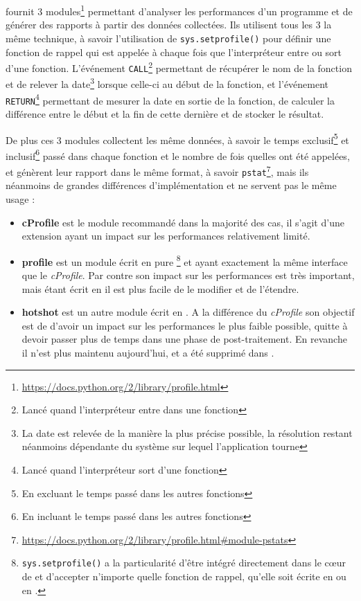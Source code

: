 \Python fournit 3 modules\footnote{\url{https://docs.python.org/2/library/profile.html}} permettant d'analyser les performances d'un programme et de générer des rapports à partir des données collectées. Ils utilisent tous les 3 la même technique, à savoir l'utilisation de \verb|sys.setprofile()| pour définir une fonction de rappel qui est appelée à chaque fois que l'interpréteur entre ou sort d'une fonction. L'événement \verb|CALL|\footnote{Lancé quand l'interpréteur entre dans une fonction} permettant de récupérer le nom de la fonction et de relever la date\footnote{La date est relevée de la manière la plus précise possible, la résolution restant néanmoins dépendante du système sur lequel l'application tourne} lorsque celle-ci au début de la fonction, et l'événement \verb|RETURN|\footnote{Lancé quand l'interpréteur sort d'une fonction} permettant de mesurer la date en sortie de la fonction, de calculer la différence entre le début et la fin de cette dernière et de stocker le résultat.

De plus ces 3 modules collectent les même données, à savoir le temps exclusif\footnote{En excluant le temps passé dans les autres fonctions} et inclusif\footnote{En incluant le temps passé dans les autres fonctions} passé dans chaque fonction et le nombre de fois quelles ont été appelées, et génèrent leur rapport dans le même format, à savoir \verb|pstat|\footnote{\url{https://docs.python.org/2/library/profile.html#module-pstats}}, mais ils néanmoins de grandes différences d'implémentation et ne servent pas le même usage : 
\begin{itemize}
\item \textbf{cProfile} est le module recommandé dans la majorité des cas, il s'agit d'une extension \C ayant un impact sur les performances relativement limité.
\item \textbf{profile} est un module écrit en pure \Python\footnote{\verb?sys.setprofile()? a la particularité d'être intégré directement dans le cœur de \Python et d'accepter n'importe quelle fonction de rappel, qu'elle soit écrite en \C ou en \Python.} et ayant exactement la même interface que le \emph{cProfile}. Par contre son impact sur les performances est très important, mais étant écrit en \Python il est plus facile de le modifier et de l'étendre.
\item \textbf{hotshot} est un autre module écrit en \C. A la différence du \emph{cProfile} son objectif est de d'avoir un impact sur les performances le plus faible possible, quitte à devoir passer plus de temps dans une phase de post-traitement. En revanche il n'est plus maintenu aujourd'hui, et a été supprimé dans .
\end{itemize}